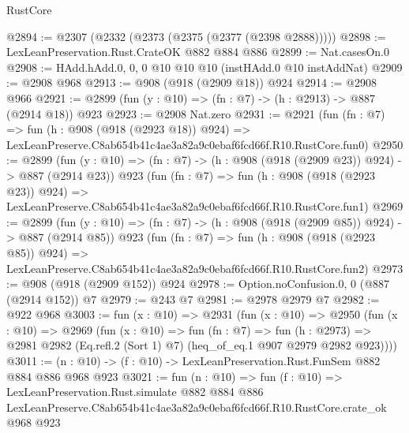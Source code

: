 \begin{lexlean}{RustCore}
\begin{coremodule}
@2894 := @2307 (@2332 (@2373 (@2375 (@2377 (@2398 @2888)))))
@2898 := LexLeanPreservation.Rust.CrateOK @882 @884 @886
@2899 := Nat.casesOn.{0}
@2908 := HAdd.hAdd.{0, 0, 0} @10 @10 @10 (instHAdd.{0} @10 instAddNat)
@2909 := @2908 @968
@2913 := @908 (@918 (@2909 @18)) @924
@2914 := @2908 @966
@2921 := @2899 (fun (y : @10) => (fn : @7) -> (h : @2913) -> @887 (@2914 @18)) @923
@2923 := @2908 Nat.zero
@2931 := @2921
    (fun (fn : @7) =>
    fun (h : @908 (@918 (@2923 @18)) @924) =>
    LexLeanPreserve.C8ab654b41c4ae3a82a9c0ebaf6fcd66f.R10.RustCore.fun0)
@2950 := @2899
    (fun (y : @10) => (fn : @7) -> (h : @908 (@918 (@2909 @23)) @924) -> @887 (@2914 @23))
    @923
    (fun (fn : @7) =>
    fun (h : @908 (@918 (@2923 @23)) @924) =>
    LexLeanPreserve.C8ab654b41c4ae3a82a9c0ebaf6fcd66f.R10.RustCore.fun1)
@2969 := @2899
    (fun (y : @10) => (fn : @7) -> (h : @908 (@918 (@2909 @85)) @924) -> @887 (@2914 @85))
    @923
    (fun (fn : @7) =>
    fun (h : @908 (@918 (@2923 @85)) @924) =>
    LexLeanPreserve.C8ab654b41c4ae3a82a9c0ebaf6fcd66f.R10.RustCore.fun2)
@2973 := @908 (@918 (@2909 @152)) @924
@2978 := Option.noConfusion.{0, 0} (@887 (@2914 @152)) @7
@2979 := @243 @7
@2981 := @2978 @2979 @7
@2982 := @922 @968
@3003 := fun (x : @10) =>
  @2931
    (fun (x : @10) =>
    @2950
      (fun (x : @10) =>
      @2969
        (fun (x : @10) =>
        fun (fn : @7) =>
        fun (h : @2973) =>
        @2981 @2982 (Eq.refl.{2} (Sort 1) @7) (heq_of_eq.{1} @907 @2979 @2982 @923))))
@3011 := (n : @10) -> (f : @10) -> LexLeanPreservation.Rust.FunSem @882 @884 @886 @968 @923
@3021 := fun (n : @10) =>
  fun (f : @10) =>
  LexLeanPreservation.Rust.simulate
    @882
    @884
    @886
    LexLeanPreserve.C8ab654b41c4ae3a82a9c0ebaf6fcd66f.R10.RustCore.crate_ok
    @968
    @923
\end{coremodule}
\end{lexlean}
